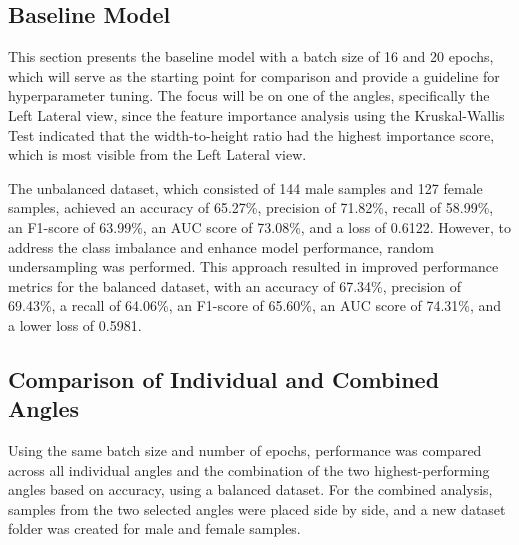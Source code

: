 \subsection{Baseline Model}
This section presents the baseline model with a batch size of 16 and 20 epochs, which will serve as the starting point for comparison and provide a guideline for hyperparameter tuning. The focus will be on one of the angles, specifically the Left Lateral view, since the feature importance analysis using the Kruskal-Wallis Test indicated that the width-to-height ratio had the highest importance score, which is most visible from the Left Lateral view.

\begin{table}[H]
	\centering
	\caption{Performance Metrics for Unbalanced vs. Balanced Datasets (Batch Size: 16, Epochs: 20)}
	\label{tab:unbalanced-balanced}
\end{table}

The unbalanced dataset, which consisted of 144 male samples and 127 female samples, achieved an accuracy of 65.27\%, precision of 71.82\%, recall of 58.99\%, an F1-score of 63.99\%, an AUC score of 73.08\%, and a loss of 0.6122. However, to address the class imbalance and enhance model performance, random undersampling was performed. This approach resulted in improved performance metrics for the balanced dataset, with an accuracy of 67.34\%, precision of 69.43\%, a recall of 64.06\%, an F1-score of 65.60\%, an AUC score of 74.31\%, and a lower loss of 0.5981.

\subsection{Comparison of Individual and Combined Angles}
Using the same batch size and number of epochs, performance was compared across all individual angles and the combination of the two highest-performing angles based on accuracy, using a balanced dataset. For the combined analysis, samples from the two selected angles were placed side by side, and a new dataset folder was created for male and female samples. 

